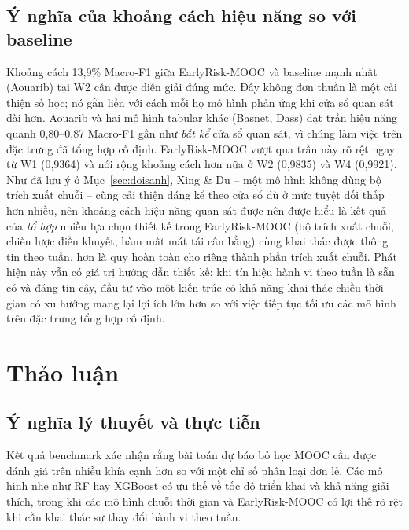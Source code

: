 \subsection{Ý nghĩa của khoảng cách hiệu năng so với baseline}

Khoảng cách 13,9\% Macro-F1 giữa EarlyRisk-MOOC và baseline mạnh nhất (Aouarib) tại W2 cần được diễn giải đúng mức. Đây không đơn thuần là một cải thiện số học; nó gắn liền với cách mỗi họ mô hình phản ứng khi cửa sổ quan sát dài hơn. Aouarib và hai mô hình tabular khác (Basnet, Dass) đạt trần hiệu năng quanh 0,80--0,87 Macro-F1 gần như \emph{bất kể} cửa sổ quan sát, vì chúng làm việc trên đặc trưng đã tổng hợp cố định. EarlyRisk-MOOC vượt qua trần này rõ rệt ngay từ W1 (0,9364) và nới rộng khoảng cách hơn nữa ở W2 (0,9835) và W4 (0,9921). Như đã lưu ý ở Mục~\ref{sec:doisanh}, Xing \& Du -- một mô hình không dùng bộ trích xuất chuỗi -- cũng cải thiện đáng kể theo cửa sổ dù ở mức tuyệt đối thấp hơn nhiều, nên khoảng cách hiệu năng quan sát được nên được hiểu là kết quả của \emph{tổ hợp} nhiều lựa chọn thiết kế trong EarlyRisk-MOOC (bộ trích xuất chuỗi, chiến lược điền khuyết, hàm mất mát tái cân bằng) cùng khai thác được thông tin theo tuần, hơn là quy hoàn toàn cho riêng thành phần trích xuất chuỗi. Phát hiện này vẫn có giá trị hướng dẫn thiết kế: khi tín hiệu hành vi theo tuần là sẵn có và đáng tin cậy, đầu tư vào một kiến trúc có khả năng khai thác chiều thời gian có xu hướng mang lại lợi ích lớn hơn so với việc tiếp tục tối ưu các mô hình trên đặc trưng tổng hợp cố định.

\section{Thảo luận}
\label{sec:thaoluan}

\subsection{Ý nghĩa lý thuyết và thực tiễn}

Kết quả benchmark xác nhận rằng bài toán dự báo bỏ học MOOC cần được đánh giá trên nhiều khía cạnh hơn so với một chỉ số phân loại đơn lẻ. Các mô hình nhẹ như RF hay XGBoost \cite{Alamri2019,Dass2021,Aouarib2025} có ưu thế về tốc độ triển khai và khả năng giải thích, trong khi các mô hình chuỗi thời gian \cite{Fei2015} và EarlyRisk-MOOC có lợi thế rõ rệt khi cần khai thác sự thay đổi hành vi theo tuần.


